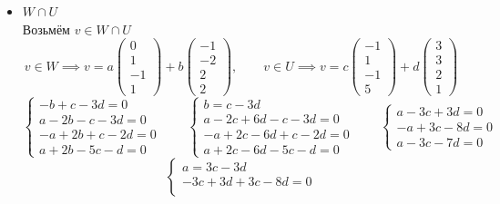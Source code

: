 \begin{itemize}
	\item $ W \cap U $ \\
    Возьмём $ v \in W \cap U $
    $$ v \in W \implies v = a
    \begin{pmatrix}
    	0 \\
        1 \\
        -1 \\
        1
    \end{pmatrix} + b
    \begin{pmatrix}
    	-1 \\
        -2 \\
        2 \\
        2
    \end{pmatrix}, \qquad v \in U \implies v = c
    \begin{pmatrix}
    	-1 \\
        1 \\
        -1 \\
        5
    \end{pmatrix} + d
    \begin{pmatrix}
    	3 \\
        3 \\
        2 \\
        1
    \end{pmatrix} $$
    $$
    \begin{cases}
    	-b + c - 3d = 0 \\
        a - 2b - c - 3d = 0 \\
        -a + 2b + c - 2d = 0 \\
        a + 2b - 5c - d = 0
    \end{cases} \qquad
    \begin{cases}
    	b = c - 3d \\
        a - 2c + 6d - c - 3d = 0 \\
        -a + 2c - 6d + c - 2d = 0 \\
        a + 2c - 6d - 5c - d = 0
    \end{cases} \qquad
    \begin{cases}
    	a - 3c + 3d = 0 \\
        -a + 3c - 8d = 0 \\
        a - 3c - 7d = 0
    \end{cases} $$
    $$
    \begin{cases}
    	a = 3c - 3d \\
        -3c + 3d + 3c - 8d = 0 \\

\end{cases}$$
\end{itemize}
